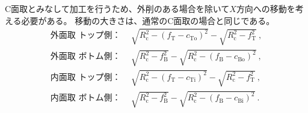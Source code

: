 \clearpage
C面取とみなして加工を行うため、外削のある場合を除いて$X$方向への移動を考える必要がある。
移動の大きさは、通常のC面取の場合と同じである。
\begin{align*}
  \text{外面取 トップ側：}&~~
  \sqrt{R_\mathrm c^2-\left(f_\mathrm T-c_\mathrm{To}\right)^2}-\sqrt{R_\mathrm c^2-f_\mathrm T^2}\ ,\\
  \text{外面取 ボトム側：}&~~
  \sqrt{R_\mathrm c^2-f_\mathrm B^2}-\sqrt{R_\mathrm c^2-\left(f_\mathrm B-c_\mathrm{Bo}\right)^2}\ ,\\
  \text{内面取 トップ側：}&~~
  \sqrt{R_\mathrm c^2-\left(f_\mathrm T-c_\mathrm{Ti}\right)^2}-\sqrt{R_\mathrm c^2-f_\mathrm T^2}\ ,\\
  \text{内面取 ボトム側：}&~~
  \sqrt{R_\mathrm c^2-f_\mathrm B^2}-\sqrt{R_\mathrm c^2-\left(f_\mathrm B-c_\mathrm{Bi}\right)^2}\ .
\end{align*}
